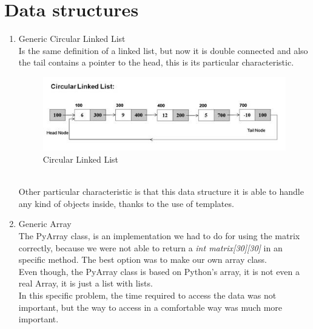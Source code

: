\documentclass[twocolumn]{IEEEtran}
\begin{document}
\section{Data structures}

	\begin{enumerate}
		\item Generic Circular Linked List\\
        
        Is the same definition of a linked list, but now it is double connected and also the 
        tail contains a pointer to the head, this is its particular characteristic.
     	   \begin{figure}[h!]
				\centering
				\includegraphics[width=\columnwidth]{src/circularLinkedList.jpg}
				\caption{Circular Linked List}
			\end{figure}\\
		Other particular characteristic is that this data structure it is able to handle any 
        kind of objects inside, thanks to the use of templates.\\
        
        \item Generic Array\\
        The PyArray class, is an implementation we had to do for using the matrix correctly, because we were not able to return a \textit{int matrix[30][30]} in an specific method. The best option was to make our own array class.\\ 
        Even though, the PyArray class is based on Python's array, it is not even a real Array, it is just a list with lists.\\ 
        In this specific problem, the time required to access the data was not important, but the way to access in a comfortable way was much more important.\\


\end{enumerate}
\end{document}
